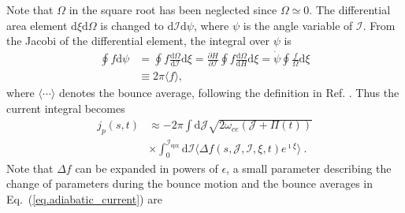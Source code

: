 Note that $\Omega$ in the square root has been  neglected since $\Omega \simeq 0$.
The differential area element $\mathrm{d}\xi\mathrm{d}\Omega$ is changed to $\mathrm{d}\mathcal{I}\mathrm{d}\psi$, where $\psi$ is the angle variable of $\mathcal{I}$.
From the Jacobi of the differential element, the integral over $\psi$ is
\begin{equation}
    \begin{aligned}
      \oint f \mathrm{d}\psi & = \oint f \frac{\mathrm{d}\Omega}{\mathrm{d}\mathcal{I}}\mathrm{d}\xi = \frac{\partial H}{\partial \mathcal{I}} \oint f \frac{\mathrm{d}\Omega}{\mathrm{d} H}\mathrm{d}\xi = \dot{\psi}\oint \frac{f}{\Omega} \mathrm{d}\xi
      \\
      &\equiv 2 \pi \langle f \rangle,
    \end{aligned}
\end{equation}
where $\langle\cdots\rangle$ denotes the bounce average, following the definition in Ref. \cite{berk1999}.
Thus the current integral becomes
\begin{equation}\label{eq.adiabatic_current}
\begin{aligned}
    j_p(s,t)  &\approx -  {2\pi} \int\mathrm{d} \mathcal{J}  \sqrt{2\omega_{ce} (\mathcal{J} + \Pi(t))} \\
    & \times 
    \int_0^{\mathcal{I}_{\mathrm{s p x}}}\mathrm{d}\mathcal{I}  \langle \Delta f(s,\mathcal{J},\mathcal{I},\xi,t)e^{\imath \xi} \rangle  ~.
\end{aligned}
\end{equation}
Note that $\Delta f$ can be expanded in powers of $\epsilon$, a small parameter describing the change of parameters during the bounce motion
and the bounce averages in Eq.~(\ref{eq.adiabatic_current}) are 
